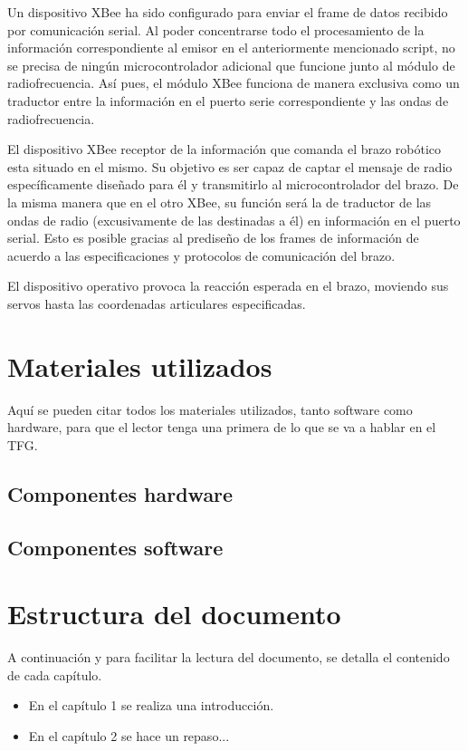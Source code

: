 Un dispositivo XBee ha sido configurado para enviar el frame de datos recibido por comunicación serial. Al poder concentrarse todo el procesamiento de la información correspondiente al emisor en el anteriormente mencionado script, no se precisa de ningún microcontrolador adicional que funcione junto al módulo de radiofrecuencia. Así pues, el módulo XBee funciona de manera exclusiva como un traductor entre la información en el puerto serie correspondiente y las ondas de radiofrecuencia.

El dispositivo XBee receptor de la información que comanda el brazo robótico esta situado en el mismo. Su objetivo es ser capaz de captar el mensaje de radio específicamente diseñado para él y transmitirlo al microcontrolador del brazo. De la misma manera que en el otro XBee, su función será la de traductor de las ondas de radio (excusivamente de las destinadas a él) en información en el puerto serial. Esto es posible gracias al prediseño de los frames de información de acuerdo a las especificaciones y protocolos de comunicación del brazo.

El dispositivo operativo provoca la reacción esperada en el brazo, moviendo sus servos hasta las coordenadas articulares especificadas.

\section{Materiales utilizados}

Aquí se pueden citar todos los materiales utilizados, tanto software como hardware, para que el lector tenga una primera de lo que se va a hablar en el TFG.

\subsection{Componentes hardware}

\subsection{Componentes software}

\section{Estructura del documento}

A continuación y para facilitar la lectura del documento, se detalla el contenido de cada capítulo.

\begin{itemize}
\item En el capítulo 1 se realiza una introducción.
\item En el capítulo 2 se hace un repaso...
\end{itemize}
